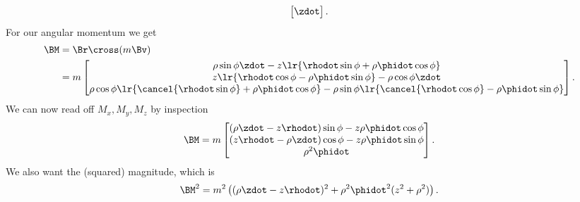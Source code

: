 {\begin{dmath}
\begin{bmatrix}
\zdot
\end{bmatrix}.
\end{dmath}
%
For our angular momentum we get
%
\begin{equation}\label{eqn:classicalMechanicsPs2:1130}
\begin{aligned}
\BM
&= \Br \cross (m \Bv) \\
&=
m
\begin{bmatrix}
\rho\sin\phi \zdot - z \lr{ \rhodot \sin\phi + \rho \phidot \cos\phi } \\
z \lr{ \rhodot \cos\phi - \rho \phidot \sin\phi } - \rho \cos\phi \zdot \\
\rho \cos\phi \lr{ \cancel{\rhodot \sin\phi} + \rho \phidot \cos\phi }
 - \rho\sin\phi \lr{ \cancel{\rhodot \cos\phi} - \rho \phidot \sin\phi }
\end{bmatrix} .
\end{aligned}
\end{equation}
%
We can now read off \(M_x, M_y, M_z\) by inspection
%
\begin{dmath}\label{eqn:classicalMechanicsPs2:150}
\BM =
m
\begin{bmatrix}
(\rho \zdot
- z \rhodot )\sin\phi
- z \rho \phidot \cos\phi
\\
( z \rhodot
- \rho \zdot ) \cos\phi
- z \rho \phidot \sin\phi
\\
\rho^2 \phidot
\end{bmatrix}.
\end{dmath}
%
We also want the (squared) magnitude, which is
%
\begin{dmath}\label{eqn:classicalMechanicsPs2:170}
\BM^2
=
m^2 \left(
(\rho \zdot - z \rhodot )^2
+ \rho^2 \phidot^2 ( z^2 + \rho^2 )
\right).
\end{dmath}
}
%
